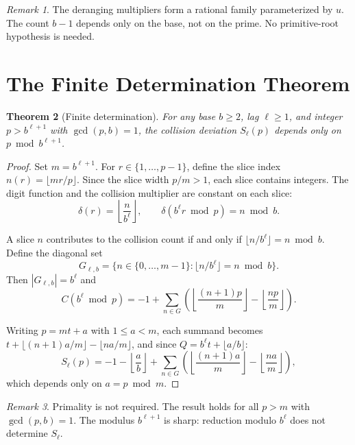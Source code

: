 \documentclass[12pt]{amsart}
\newtheorem{theorem}{Theorem}
\theoremstyle{definition}
\theoremstyle{remark}
\newtheorem{remark}[theorem]{Remark}
\begin{document}
\begin{remark}
The deranging multipliers form a rational family
parameterized by $u$. The count $b - 1$ depends only
on the base, not on the prime. No primitive-root
hypothesis is needed.
\end{remark}

\section{The Finite Determination Theorem}

\begin{theorem}[Finite determination]\label{thm:finite}
For any base $b \ge 2$, lag $\ell \ge 1$, and integer
$p > b^{\ell+1}$ with $\gcd(p, b) = 1$, the collision
deviation $S_{\ell}(p)$ depends only on
$p \bmod b^{\ell+1}$.
\end{theorem}

\begin{proof}
Set $m = b^{\ell+1}$. For $r \in \{1, \ldots, p{-}1\}$,
define the slice index $n(r) = \lfloor mr/p \rfloor$.
Since the slice width $p/m > 1$, each slice contains
integers. The digit function and the collision multiplier
are constant on each slice:
\[
\delta(r) = \left\lfloor \frac{n}{b^{\ell}} \right\rfloor,
\qquad
\delta(b^{\ell} r \bmod p) = n \bmod b.
\]

A slice $n$ contributes to the collision count if and
only if $\lfloor n/b^{\ell} \rfloor = n \bmod b$. Define
the diagonal set
\[
G_{\ell,b} = \{n \in \{0, \ldots, m{-}1\} :
\lfloor n/b^{\ell} \rfloor = n \bmod b\}.
\]
Then $|G_{\ell,b}| = b^{\ell}$ and
\[
C(b^{\ell} \bmod p) = -1 + \sum_{n \in G}
\left(
\left\lfloor \frac{(n{+}1)p}{m} \right\rfloor
- \left\lfloor \frac{np}{m} \right\rfloor
\right).
\]

Writing $p = mt + a$ with $1 \le a < m$, each summand
becomes $t + \lfloor(n{+}1)a/m\rfloor
- \lfloor na/m \rfloor$, and since
$Q = b^{\ell} t + \lfloor a/b \rfloor$:
\[
S_{\ell}(p) = -1 - \left\lfloor \frac{a}{b} \right\rfloor
+ \sum_{n \in G}
\left(
\left\lfloor \frac{(n{+}1)a}{m} \right\rfloor
- \left\lfloor \frac{na}{m} \right\rfloor
\right),
\]
which depends only on $a = p \bmod m$.
\end{proof}

\begin{remark}
Primality is not required. The result holds for all
$p > m$ with $\gcd(p, b) = 1$. The modulus $b^{\ell+1}$
is sharp: reduction modulo $b^{\ell}$ does not determine
$S_{\ell}$.
\end{remark}
\end{document}
